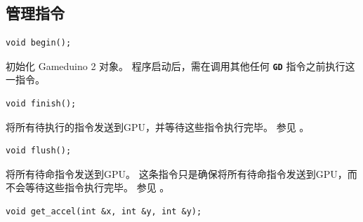 \documentclass[10pt]{book}
\makeatletter
\newcommand{\gdtwo}{Gameduino 2 }
\newcommand{\mach}[1]{\texttt{\textbf{#1}}}
\newcommand{\cmdidx}[1]{
\index{#1@\mach{#1()}}
}
\newcommand{\cmd}[1]{\cmdidx{cmd\_#1}\nameref{cmd:#1}}
\makeatother
\begin{document}
\begin{CJK}{UTF8}{gkai}
\newcommand{\highcmd}[2]{
\section{\texttt{cmd\_#1}}
\label{cmd:#1}
\index{cmd\_#1@\mach{cmd\_#1()}|boldindex}
}




\chapter{管理指令}


\begin{framed}
\begin{verbatim}
void begin();
\end{verbatim}
\end{framed}

初始化 \gdtwo 对象。
程序启动后，需在调用其他任何 \mach{GD} 指令之前执行这一指令。


\begin{framed}
\begin{verbatim}
void finish();
\end{verbatim}
\end{framed}

将所有待执行的指令发送到GPU，并等待这些指令执行完毕。
参见  。

\newpage
{}

\begin{framed}
\begin{verbatim}
void flush();
\end{verbatim}
\end{framed}

将所有待命指令发送到GPU。
这条指令只是确保将所有待命指令发送到GPU，而不会等待这些指令执行完毕。
参见  。


\begin{framed}
\begin{verbatim}
void get_accel(int &x, int &y, int &y);
\end{verbatim}
\end{framed}


\end{CJK}
\end{document}
